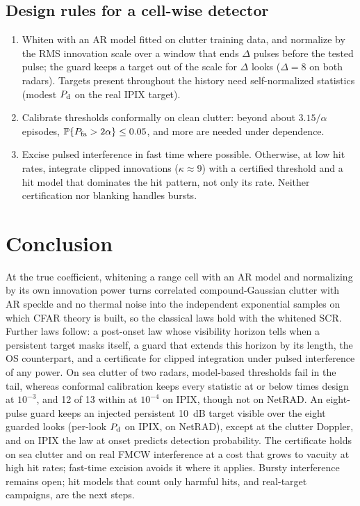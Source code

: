 \documentclass[journal]{IEEEtran}
\newcommand{\PP}{\mathbb{P}}
\begin{document}
\subsection{Design rules for a cell-wise detector}
\begin{enumerate}[leftmargin=*,itemsep=0pt]
\item Whiten with an AR model fitted on clutter training data, and normalize by the RMS innovation scale over a window that ends $\Delta$ pulses before the tested pulse; the guard keeps a target out of the scale for $\Delta$ looks ($\Delta=8$ on both radars). Targets present throughout the history need self-normalized statistics (modest $P_{\rm d}$ on the real IPIX target).
\item Calibrate thresholds conformally on clean clutter: beyond about $3.15/\alpha$ episodes, $\PP\{P_{\rm fa}>2\alpha\}\le0.05$, and more are needed under dependence.
\item Excise pulsed interference in fast time where possible. Otherwise, at low hit rates, integrate clipped innovations ($\kappa\approx9$) with a certified threshold and a hit model that dominates the hit pattern, not only its rate. Neither certification nor blanking handles bursts.
\end{enumerate}

\section{Conclusion}
At the true coefficient, whitening a range cell with an AR model and normalizing by its own innovation power turns correlated compound-Gaussian clutter with AR speckle and no thermal noise into the independent exponential samples on which CFAR theory is built, so the classical laws hold with the whitened SCR. Further laws follow: a post-onset law whose visibility horizon tells when a persistent target masks itself, a guard that extends this horizon by its length, the OS counterpart, and a certificate for clipped integration under pulsed interference of any power. On sea clutter of two radars, model-based thresholds fail in the tail, whereas conformal calibration keeps every statistic at or below \NetConfMaxThree{} times design at $10^{-3}$, and 12 of 13 within \LConfMaxFour{} at $10^{-4}$ on IPIX, though not on NetRAD. An eight-pulse guard keeps an injected persistent 10~dB target visible over the eight guarded looks (per-look $P_{\rm d}$ \GuardMeanLookEight{} on IPIX, \NetGuardEight{} on NetRAD), except at the clutter Doppler, and on IPIX the law at onset predicts detection probability. The certificate holds on sea clutter and on real FMCW interference at a cost that grows to vacuity at high hit rates; fast-time excision avoids it where it applies. Bursty interference remains open; hit models that count only harmful hits, and real-target campaigns, are the next steps.
\end{document}
